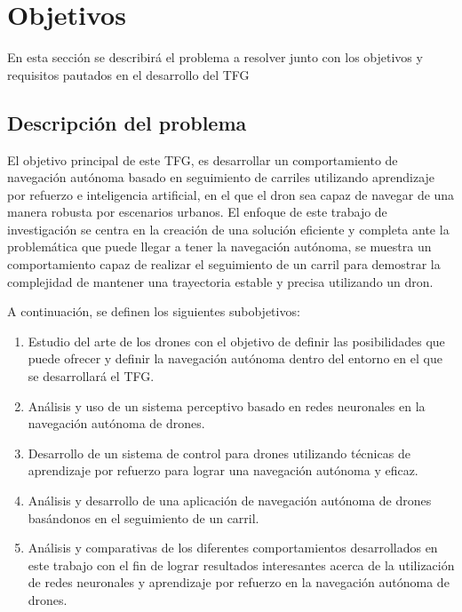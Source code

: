 \chapter{Objetivos}
\label{cap:capitulo2}

En esta sección se describirá el problema a resolver junto con los objetivos y requisitos pautados en el desarrollo del TFG

\section{Descripción del problema}
\label{sec:descripcion}

El objetivo principal de este TFG, es desarrollar un comportamiento de navegación autónoma basado en seguimiento de carriles utilizando
aprendizaje por refuerzo e inteligencia artificial, en el que el dron sea capaz de navegar de una manera robusta por escenarios urbanos. El enfoque de este trabajo de investigación 
se centra en la creación de una solución eficiente y completa ante la problemática que puede llegar a tener la navegación autónoma, se 
muestra un comportamiento capaz de realizar el seguimiento de un carril para demostrar la complejidad de mantener una trayectoria estable 
y precisa utilizando un dron. 

A continuación, se definen los siguientes subobjetivos: 

\begin{enumerate}
    \item Estudio del arte de los drones con el objetivo de definir las posibilidades que puede ofrecer y definir 
    la navegación autónoma dentro del entorno en el que se desarrollará el TFG. 
    \item Análisis y uso de un sistema perceptivo basado en redes neuronales en la navegación autónoma de drones.
    \item Desarrollo  de un sistema de control para drones utilizando técnicas de aprendizaje por refuerzo para lograr una navegación 
    autónoma y eficaz.
    \item Análisis y desarrollo de una aplicación de navegación autónoma de drones basándonos en el seguimiento de un carril.
    \item Análisis y comparativas de los diferentes comportamientos desarrollados en este trabajo con el fin de 
    lograr resultados interesantes acerca de la utilización de redes neuronales y aprendizaje por refuerzo en la navegación autónoma de drones.
\end{enumerate}
\newpage
